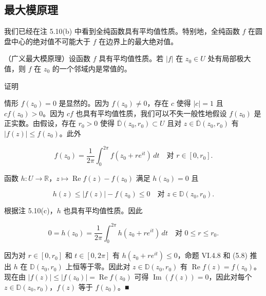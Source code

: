 \subsection*{最大模原理}

我们已经在注 5.10(b) 中看到全纯函数具有平均值性质。特别地，全纯函数 $ f $ 在圆盘中心的绝对值不可能大于 $ f $ 在边界上的最大绝对值。

\begin{theorem}

（广义最大模原理）设函数 $ f $ 具有平均值性质。若 $ |f| $ 在 $ z_{0} \in U $ 处有局部极大值，则 $ f $ 在 $ z_{0} $ 的一个邻域内是常值的。

证明

\begin{subitems}
\item

情形 $ f(z_{0}) = 0 $ 是显然的。因为 $ f(z_{0}) \ne 0 $，存在 $ c $ 使得 $ |c| = 1 $ 且 $ cf(z_{0}) > 0 $。因为 $ cf $ 也具有平均值性质，我们可以不失一般性地假设 $ f(z_{0}) $ 是正实数。由假设，存在 $ r_{0} > 0 $ 使得 $ \overline{\mathbb{D}}(z_{0},r_{0}) \subset U $ 且对 $ z \in \overline{\mathbb{D}}(z_{0},r_{0}) $ 有 $ |f(z)| \le f(z_{0}) $。此外

\[
f(z_{0}) = \frac{1}{2\pi}\int_{0}^{2\pi}f(z_{0} + re^{it})\,dt \quad \text{对 } r \in [0,r_{0}] .
\]
\item

函数 $ h : U \to \mathbb{R} $，$ z \mapsto \operatorname{Re} f(z) - f(z_{0}) $ 满足 $ h(z_{0}) = 0 $ 且

\[
h(z) \le |f(z)| - f(z_{0}) \le 0 \quad \text{对 } z \in \mathbb{D}(z_{0},r_{0}) .
\]

根据注 5.10(c)，$ h $ 也具有平均值性质。因此

\begin{equation}
0 = h(z_{0}) = \frac{1}{2\pi}\int_{0}^{2\pi}h(z_{0} + re^{it})\,dt \quad \text{对 } 0 \le r \le r_{0} .\tag{5.8}
\end{equation}

因为对 $ r \in [0,r_{0}] $ 和 $ t \in [0,2\pi] $ 有 $ h(z_{0} + re^{it}) \le 0 $，命题 VI.4.8 和 (5.8) 推出 $ h $ 在 $ \mathbb{D}(z_{0},r_{0}) $ 上恒等于零。因此对 $ z \in \mathbb{D}(z_{0},r_{0}) $ 有 $ \operatorname{Re} f(z) = f(z_{0}) $。现在由 $ |f(z)| \le |f(z_{0})| = \operatorname{Re} f(z_{0}) $ 可得 $ \operatorname{Im}(f(z)) = 0 $，因此对每个 $ z \in \mathbb{D}(z_{0},r_{0}) $，$ f(z) $ 等于 $ f(z_{0}) $。\nobreak\hspace{0.35em}■

\end{subitems}

\end{theorem}

